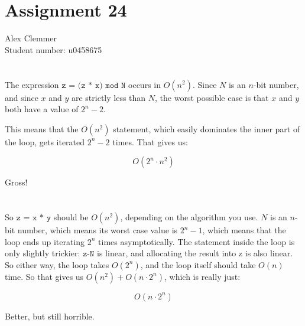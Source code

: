 \documentclass[a4paper]{article}
\begin{document}
\section*{Assignment 24}
Alex Clemmer\\
Student number: u0458675

\section{}

The expression $\texttt{z = (z * x) mod N}$ occurs in $O(n^2)$. Since $N$ is an $n$-bit number, and since $x$ and $y$ are strictly less than $N$, the worst possible case is that $x$ and $y$ both have a value of $2^n-2$.

This means that the $O(n^2)$ statement, which easily dominates the inner part of the loop, gets iterated $2^n-2$ times. That gives us:

\begin{equation}
O(2^n \cdot n^2)
\end{equation}

Gross!

\section{}

So $\texttt{z = x * y}$ should be $O(n^2)$, depending on the algorithm you use. $N$ is an $n$-bit number, which means its worst case value is $2^n-1$, which means that the loop ends up iterating $2^n$ times asymptotically. The statement inside the loop is only slightly trickier: $\texttt{z-N}$ is linear, and allocating the result into $\text{z}$ is also linear. So either way, the loop takes $O(2^n)$, and the loop itself should take $O(n)$ time. So that gives us $O(n^2) + O(n \cdot 2^n)$, which is really just:

\begin{equation}
O(n \cdot 2^n)
\end{equation}

Better, but still horrible.
\end{document}
